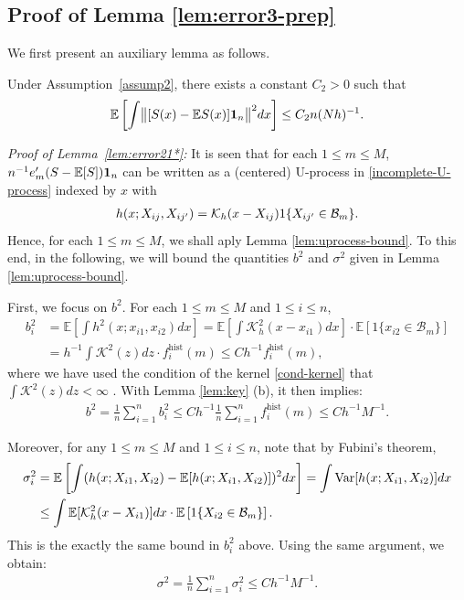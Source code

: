 \documentclass[preprint,11pt]{article}
\newcommand{\mbb}{\mathbb}
\newcommand{\Var}{\text{Var}}
\newcommand{\mcal}{\mathcal}
\numberwithin{equation}{section}
\begin{document}
\subsection{Proof of Lemma \ref{lem:error3-prep}}
We first present an auxiliary lemma as follows.
\begin{lemma} \label{lem:error21*}
Under Assumption~\ref{assump2}, 
there exists a constant $C_2>0$ such that 
\[
\mbb{E}\left[\int \bigl\|[S(x)-\mathbb{E}S(x)]{\bf 1}_n\bigr\|^2dx\right] \le C_2n(Nh)^{-1}. 
\]
\end{lemma}
\noindent
{\it Proof of Lemma~\ref{lem:error21*}:} 
It is seen that for each $1\le m\le M$, $n^{-1}e_m'(S -\mathbb{E}[S]){\bf 1}_n$ can be written as a (centered) U-process in \eqref{incomplete-U-process} indexed by $x$ with
\begin{align*}
    h(x;X_{ij},X_{ij'})={\cal K}_h(x-X_{ij})1\{X_{ij'}\in\mcal{B}_m\}.
\end{align*}
Hence, for each $1\le m\le M$, we shall aply Lemma \ref{lem:uprocess-bound}. To this end, in the following, we will bound the quantities $b^2$ and $\sigma^2$ given in Lemma \ref{lem:uprocess-bound}.

First, we focus on $b^2$. For each $1\le m\le M$ and $1\le i\le n$, 
    \begin{align*}
         b_i^2&=\mbb{E}\left[\int h^2(x;x_{i1},x_{i2})dx\right]=\mbb{E}\left[\int\mcal{K}^2_h(x-x_{i1})dx\right]\cdot \mbb{E}\left[1\{x_{i2}\in\mcal{B}_m\}\right]\\
         &=h^{-1}\int \mcal{K}^2(z)dz\cdot f_i^{\text{hist}}(m)\le Ch^{-1}f_i^{\text{hist}}(m),
    \end{align*}
where we have used the condition of the kernel \eqref{cond-kernel} that $\int \mcal{K}^2(z)dz<\infty$ . With Lemma \ref{lem:key} (b), it then implies:
\begin{align*}
 b^2 = \frac{1}{n}\sum_{i=1}^n b_i^2\le Ch^{-1}\frac{1}{n}\sum_{i=1}^n f_i^{\text{hist}}(m)\le  Ch^{-1}M^{-1}.
\end{align*}

Moreover, for any $1\le m\le M$ and $1\le i\le n$, note that by Fubini's theorem,
    \begin{align*}
        \sigma_i^2&=\mbb{E}\left[\int (h(x;X_{i1},X_{i2})-\mbb{E}[h(x;X_{i1},X_{i2})])^2dx\right]=\int \Var[h(x;X_{i1},X_{i2})]dx\\
        &\le \int \mbb{E}[{\cal K}^2_h(x-X_{i1})]dx\cdot \mbb{E}\left[1\{X_{i2}\in {\cal B}_m\}\right].
    \end{align*}
This is the exactly the same bound in $b_i^2$ above. Using the same argument, we obtain:
\begin{align*}
    \sigma^2=\frac{1}{n}\sum_{i=1}^n \sigma_i^2\le Ch^{-1}M^{-1}.
\end{align*}
\end{document}
